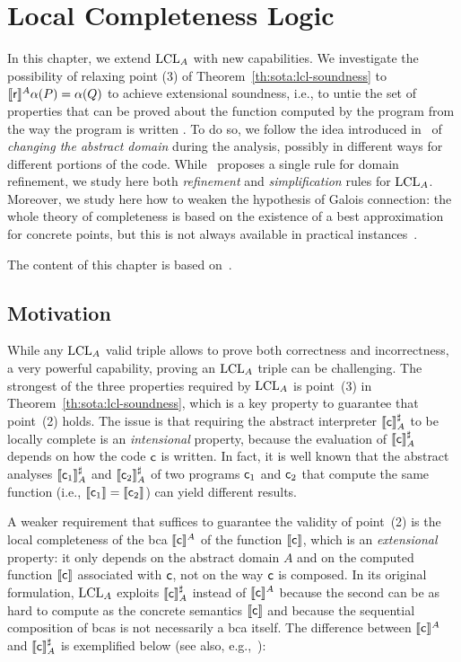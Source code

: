 
\chapter{Local Completeness Logic}\label{ch:lcla}
In this chapter, we extend $\text{LCL}_A$ with new capabilities. We investigate the possibility of relaxing point (3) of Theorem~\ref{th:sota:lcl-soundness} to $\llbracket\mathsf{r}\rrbracket^{A} \alpha(P) = \alpha(Q)$ to achieve extensional soundness, i.e., to untie the set of properties that can be proved about the function computed by the program from the way the program is written . To do so, we follow the idea introduced in~\cite[§8]{BGGR23} of \emph{changing the abstract domain} during the analysis, possibly in different ways for different portions of the code.
While~\cite{BGGR23} proposes a single rule for domain refinement, we study here both \emph{refinement} and \emph{simplification} rules for $\text{LCL}_A$.
Moreover, we study here how to weaken the hypothesis of Galois connection: the whole theory of completeness is based on the existence of a best approximation for concrete points, but this is not always available in practical instances~\cite{CC92}.

The content of this chapter is based on~\cite{ABG23}.

\section{Motivation}
While any $\text{LCL}_A$ valid triple allows to prove both correctness and incorrectness, a very powerful capability, proving an $\text{LCL}_A$ triple can be challenging.
The strongest of the three properties required by $\text{LCL}_A$ is point~(3) in Theorem~\ref{th:sota:lcl-soundness}, which is a key property to guarantee that point~(2) holds.
The issue is that requiring the abstract interpreter $\llbracket\mathsf{c}\rrbracket^{\sharp}_{A}$ to be locally complete is an \emph{intensional} property, because the evaluation of $\llbracket\mathsf{c}\rrbracket^{\sharp}_{A}$ depends on how the code $\mathsf{c}$ is written.
In fact, it is well known that the abstract analyses $\llbracket\mathsf{c}_1\rrbracket^{\sharp}_{A}$ and $\llbracket\mathsf{c}_2\rrbracket^{\sharp}_{A}$ of two programs $\mathsf{c}_1$ and $\mathsf{c}_2$ that compute the same function (i.e., $\llbracket\mathsf{c}_1\rrbracket=\llbracket\mathsf{c}_2\rrbracket$) can yield different results.

A weaker requirement that suffices to guarantee the validity of point~(2) is the local completeness of the bca $\llbracket\mathsf{c}\rrbracket^{A}$ of the function $\llbracket\mathsf{c}\rrbracket$, which is an \emph{extensional} property: it only depends on the abstract domain $A$ and on the computed function $\llbracket\mathsf{c}\rrbracket$ associated with $\mathsf{c}$, not on the way $\mathsf{c}$ is composed. In its original formulation, $\text{LCL}_A$ exploits $\llbracket\mathsf{c}\rrbracket^{\sharp}_{A}$ instead of $\llbracket\mathsf{c}\rrbracket^{A}$ because the second can be as hard to compute as the concrete semantics $\llbracket\mathsf{c}\rrbracket$ and because the sequential composition of bcas is not necessarily a bca itself.
The difference between $\llbracket\mathsf{c}\rrbracket^{A}$ and $\llbracket\mathsf{c}\rrbracket^{\sharp}_{A}$ is exemplified below (see also, e.g.,~\cite[Example~1]{LL09}):

